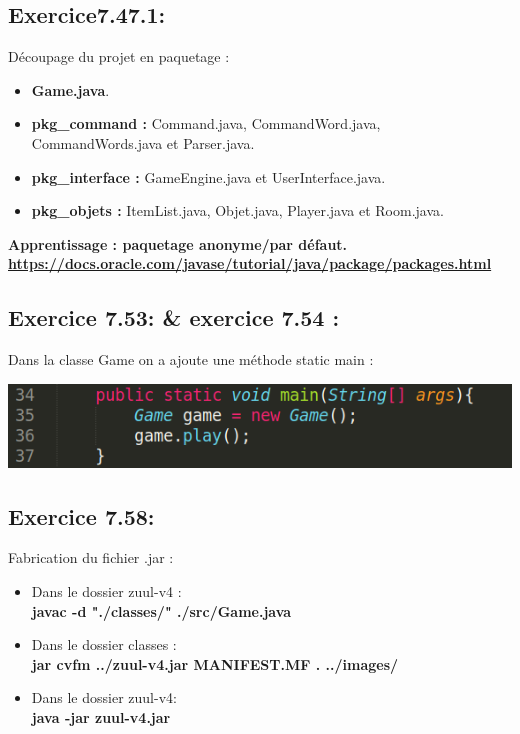 \documentclass[french,10pt,a4paper]{report}
\begin{document}
\subsection{\textcolor{bb}{Exercice7.47.1:}}
Découpage du projet en paquetage :
\begin{itemize}
\item \textbf{Game.java}.
\item \textbf{pkg\_command :} Command.java, CommandWord.java, CommandWords.java et Parser.java. 
\item \textbf{pkg\_interface :} GameEngine.java et UserInterface.java.
\item \textbf{pkg\_objets :} ItemList.java, Objet.java, Player.java et Room.java.
\end{itemize}
\textbf{\textcolor{gg}{Apprentissage : paquetage anonyme/par défaut.}\\
\textcolor{bb}{\href{https://docs.oracle.com/javase/tutorial/java/package/packages.html}{https://docs.oracle.com/javase/tutorial/java/package/packages.html}}} 

\subsection{\textcolor{bb}{Exercice 7.53: \& exercice 7.54 :}}
Dans la classe Game on a ajoute une méthode static main :
\begin{center}
	\includegraphics[scale=0.5]{captures/it4_9.png}
\end{center}

\subsection{\textcolor{bb}{Exercice 7.58:}}
Fabrication du fichier .jar :
\begin{itemize}
\item Dans le dossier zuul-v4 :\\
\textbf{javac -d "./classes/" ./src/Game.java}
\item Dans le dossier classes :\\
\textbf{jar cvfm ../zuul-v4.jar MANIFEST.MF  . ../images/}
\item Dans le dossier zuul-v4:\\
\textbf{java -jar zuul-v4.jar}
\end{itemize}
\end{document}
